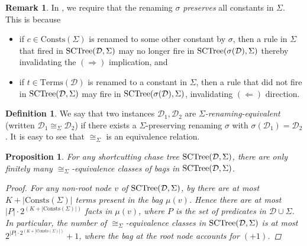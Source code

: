 \documentclass[12pt]{report}
\theoremstyle{plain}
\newtheorem{proposition}[theorem]{Proposition}
\theoremstyle{definition}
\newtheorem{definition}[theorem]{Definition}
\newtheorem{remark}[theorem]{Remark}
\def\Consts{{\mathrm{Consts}}}
\def\Terms{{\mathrm{Terms}}}
\newcommand{\SCTree}[2]{\ensuremath{\normalfont{\textrm{SCTree}}\!\left( #1, #2 \right)}}
\begin{document}
\begin{remark}
  In , we require that the renaming $\sigma$ \emph{preserves} all constants in $\Sigma$. This is because \begin{itemize}
    \item if $c \in \Consts(\Sigma)$ is renamed to some other constant by $\sigma$, then a rule in $\Sigma$ that fired in $\SCTree{\mathcal{D}}{\Sigma}$ may no longer fire in $\SCTree{\sigma(\mathcal{D})}{\Sigma}$ thereby invalidating the $(\Longrightarrow)$ implication, and
    \item if $t \in \Terms(\mathcal{D})$ is renamed to a constant in $\Sigma$, then a rule that did not fire in $\SCTree{\mathcal{D}}{\Sigma}$ may fire in $\SCTree{\sigma(\mathcal{D})}{\Sigma}$, invalidating $(\Longleftarrow)$ direction.
  \end{itemize}
\end{remark}

\begin{definition}
  We say that two instances $\mathcal{D}_1, \mathcal{D}_2$ are \emph{$\Sigma$-renaming-equivalent} (written $\mathcal{D}_1 \cong_\Sigma \mathcal{D}_2$) if there exists a $\Sigma$-preserving renaming $\sigma$ with $\sigma(\mathcal{D}_1) = \mathcal{D}_2$. It is easy to see that $\cong_\Sigma$ is an equivalence relation.
\end{definition}

\begin{proposition}
\label{proposition:renaming-equivalence-class-bound}
  For any shortcutting chase tree $\SCTree{\mathcal{D}}{\Sigma}$, there are only finitely many $\cong_\Sigma$-equivalence classes of bags in $\SCTree{\mathcal{D}}{\Sigma}$.
  \begin{proof}
    For any non-root node $v$ of $\SCTree{\mathcal{D}}{\Sigma}$, by  there are at most $K + |\Consts(\Sigma)|$ terms present in the bag $\mu(v)$. Hence there are at most $|P| \cdot 2^{(K + |\Consts(\Sigma)|)}$ facts in $\mu(v)$, where $P$ is the set of predicates in $\mathcal{D} \cup \Sigma$. In particular, the number of $\cong_\Sigma$-equivalence classes in $\SCTree{\mathcal{D}}{\Sigma}$ is at most $2^{|P| \cdot 2^{(K + |\Consts(\Sigma)|)}} + 1$, where the bag at the root node accounts for $(+1)$.
  \end{proof}
\end{proposition}
\end{document}
